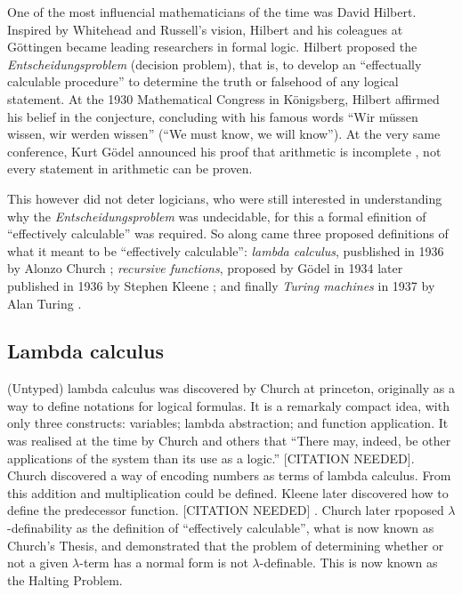 One of the most influencial mathematicians of the time was David Hilbert. Inspired by Whitehead and Russell's vision, Hilbert and his coleagues at G\"ottingen became leading researchers in formal logic. Hilbert proposed the \emph{Entscheidungsproblem} (decision problem), that is, to develop an ``effectually calculable procedure'' to determine the truth or falsehood of any logical statement. At the 1930 Mathematical Congress in K\"onigsberg, Hilbert affirmed his belief in the conjecture, concluding with his famous words ``Wir m\"ussen wissen, wir werden wissen'' (``We must know, we will know''). At the very same conference, Kurt G\"odel announced his proof that arithmetic is incomplete \cite{GlossarWiki:Goedel:1931}, not every statement in arithmetic can be proven.

This however did not deter logicians, who were still interested in understanding why the \emph{Entscheidungsproblem} was undecidable, for this a formal efinition of ``effectively calculable'' was required. So along came three proposed definitions of what it meant to be ``effectively calculable'': \emph{lambda calculus}, pusblished in 1936 by Alonzo Church \cite{church-unsolvableproblemof-1936}; \emph{recursive functions}, proposed by G\"odel in 1934 later published in 1936 by Stephen Kleene \cite{Kleene1936}; and finally \emph{Turing machines} in 1937 by Alan Turing \cite{turing1936a}.

\subsection{Lambda calculus}

(Untyped) lambda calculus was discovered by Church at princeton, originally as a way to define notations for logical formulas. It is a remarkaly compact idea, with only three constructs: variables; lambda abstraction; and function application. It was realised at the time by Church and others that ``There may, indeed, be other applications of the system than its use as a logic.'' [CITATION NEEDED]\cite{}. Church discovered a way of encoding numbers as terms of lambda calculus. From this addition and multiplication could be defined. Kleene later discovered how to define the predecessor function. [CITATION NEEDED] \cite{}. Church later rpoposed $\lambda$-definability as the definition of ``effectively calculable'', what is now known as Church's Thesis, and demonstrated that the problem of determining whether or not a given $\lambda$-term  has a normal form is not $\lambda$-definable. This is now known as the Halting Problem. 

